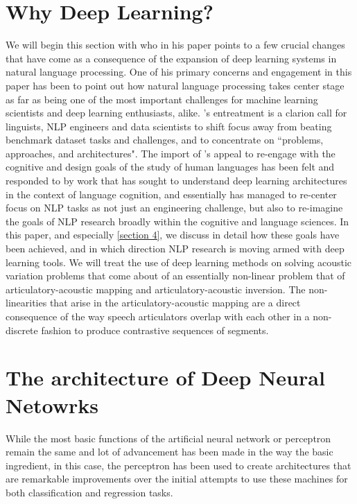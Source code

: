 \documentclass{article}
\newcommand{\possessivecite}[1]{\citeauthor{#1}'s \citeyear{#1}}
\begin{document}
\section{Why Deep Learning?}
We will begin this section with \cite{manning2015} who in his paper points to a few crucial changes that have come as a consequence of the expansion of deep learning systems in natural language processing. One of his primary concerns and engagement in this paper has been to point out how natural language processing takes center stage as far as being one of the most important challenges for machine learning scientists and deep learning enthusiasts, alike. \possessivecite{manning2015} entreatment is a clarion call for linguists, NLP engineers and data scientists to shift focus away from beating benchmark dataset tasks and challenges, and to concentrate on ``problems, approaches, and architectures". The import of \possessivecite{manning2015} appeal to re-engage with the cognitive and design goals of the study of human languages has been felt and responded to by work that has sought to understand deep learning architectures in the context of language cognition, and essentially has managed to re-center focus on NLP tasks as not just an engineering challenge, but also to re-imagine the goals of NLP research broadly within the cognitive and language sciences. In this paper, and especially \ref{section 4}, we discuss in detail how these goals have been achieved, and in which direction NLP research is moving armed with deep learning tools. We will treat the use of deep learning methods on solving acoustic variation problems that come about of an essentially non-linear problem that of articulatory-acoustic mapping and articulatory-acoustic inversion. The non-linearities that arise in the articulatory-acoustic mapping are a direct consequence of the way speech articulators overlap with each other in a non-discrete fashion to produce contrastive sequences of segments. 

\section{The architecture of Deep Neural Netowrks}
While the most basic functions of the artificial neural network or perceptron remain the same and lot of advancement has been made in the way the basic ingredient, in this case, the perceptron has been used to create architectures that are remarkable improvements over the initial attempts to use these machines for both classification and regression tasks.
\end{document}
